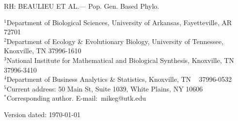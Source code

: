 \documentclass[12pt,letterpaper,fleqn]{article}
\date{Last compiled on \today\xspace at \currenttime.}
\begin{document}
\noindent RH: BEAULIEU ET AL.--- Pop. Gen. Based Phylo.

\bigskip
\medskip
\begin{center}

\bigskip





\end{center}

\vfill

{\small
\noindent$^1$Department of Biological Sciences, University of Arkansas, Fayetteville, AR 72701\\
\noindent$^{2}$Department of Ecology \& Evolutionary Biology, University of Tennessee, Knoxville, TN 37996-1610\\
\noindent$^{3}$National Institute for Mathematical and Biological Synthesis, Knoxville, TN 37996-3410\\
\noindent$^{4}$Department of Business Analytics \& Statistics, Knoxville, TN ~ 37996-0532 \\
\noindent$^{5}$Current address: 50 Main St, Suite 1039, White Plains, NY 10606\\
\noindent$^{*}$Corresponding author. E-mail:~mikeg@utk.edu
}

\vfill
\centerline{Version dated: \today}
\vfill



%
%
\end{document}
